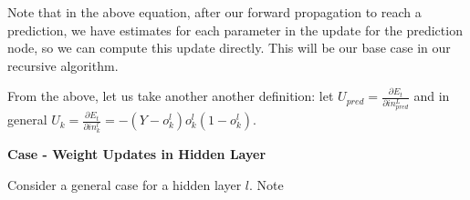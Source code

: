 \documentclass[11pt]{article}
\begin{document}
\vspace{5 mm}
\noindent
Note that in the above equation, after our forward propagation to reach a 
prediction, we have estimates for each parameter in the update for the 
prediction node, so we can compute this update directly. This will be our 
base case in our recursive algorithm.

\vspace{5 mm}
\noindent
From the above, let us take another another definition: let $U_{pred} = 
\frac{\partial E_{t}}{\partial in_{pred}^{L}}$ and in general 
$U_{k} = \frac{\partial E_{t}}{\partial in_{k}^{l}} = 
- (Y - o_{k}^{l}) o_{k}^{l} (1 - o_{k}^{l})$.

\vspace{5 mm}
\noindent
\textbf{Case - Weight Updates in Hidden Layer}

\vspace{5 mm}
\noindent
Consider a general case for a hidden layer $l$. Note
\end{document}
